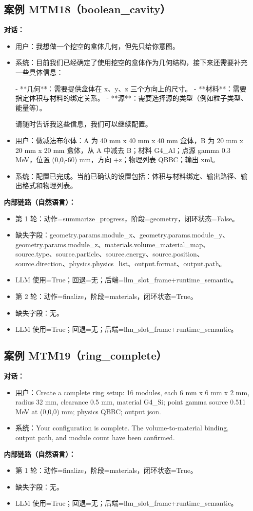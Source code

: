 \documentclass[11pt]{ctexart}
\begin{document}
\subsection{案例 MTM18（boolean\_cavity）}
\textbf{对话：}
\begin{itemize}
\item 用户：我想做一个挖空的盒体几何，但先只给你意图。
\item 系统：目前我们已经确定了使用挖空的盒体作为几何结构，接下来还需要补充一些具体信息：

- **几何**：需要提供盒体在 x、y、z 三个方向上的尺寸。
- **材料**：需要指定体积与材料的绑定关系。
- **源**：需要选择源的类型（例如粒子类型、能量等）。

请随时告诉我这些信息，我们可以继续配置。
\item 用户：做减法布尔体：A 为 40 mm x 40 mm x 40 mm 盒体，B 为 20 mm x 20 mm x 20 mm 盒体，从 A 中减去 B；材料 G4\_Al；点源 gamma 0.3 MeV，位置 (0,0,-60) mm，方向 +z；物理列表 QBBC；输出 xml。
\item 系统：配置已完成。当前已确认的设置包括：体积与材料绑定、输出路径、输出格式和物理列表。
\end{itemize}
\textbf{内部链路（自然语言）：}
\begin{itemize}
\item 第 1 轮：动作=summarize\_progress，阶段=geometry，闭环状态=False。
\item 缺失字段：geometry.params.module\_x、geometry.params.module\_y、geometry.params.module\_z、materials.volume\_material\_map、source.type、source.particle、source.energy、source.position、source.direction、physics.physics\_list、output.format、output.path。
\item LLM 使用=True；回退=无；后端=llm\_slot\_frame+runtime\_semantic。
\item 第 2 轮：动作=finalize，阶段=materials，闭环状态=True。
\item 缺失字段：无。
\item LLM 使用=True；回退=无；后端=llm\_slot\_frame+runtime\_semantic。
\end{itemize}
\subsection{案例 MTM19（ring\_complete）}
\textbf{对话：}
\begin{itemize}
\item 用户：Create a complete ring setup: 16 modules, each 6 mm x 6 mm x 2 mm, radius 32 mm, clearance 0.5 mm, material G4\_Si; point gamma source 0.511 MeV at (0,0,0) mm; physics QBBC; output json.
\item 系统：Your configuration is complete. The volume-to-material binding, output path, and module count have been confirmed.
\end{itemize}
\textbf{内部链路（自然语言）：}
\begin{itemize}
\item 第 1 轮：动作=finalize，阶段=materials，闭环状态=True。
\item 缺失字段：无。
\item LLM 使用=True；回退=无；后端=llm\_slot\_frame+runtime\_semantic。
\end{itemize}
\end{document}
